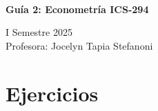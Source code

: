 \documentclass[10pt,a4paper]{article}
\begin{document}
\vspace{5cm}



\begin{center}
\begin{large}
\textbf{\\Guía 2: Econometría ICS-294}
\end{large}
\end{center}

\begin{center}
\vspace{0.2cm}
I Semestre 2025\\
Profesora: Jocelyn Tapia Stefanoni
\end{center}


\section{Ejercicios}
\end{document}
